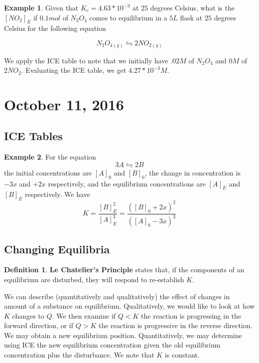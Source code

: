 \documentclass[11pt]{article}
\theoremstyle{plain} %
\theoremstyle{definition}
\newtheorem*{definition}{Definition} %
\theoremstyle{example}
\newtheorem*{example}{Example}
\theoremstyle{remark}
\begin{document}
\begin{example}
Given that $K_c = 4.63*10^{-3}$ at $25$ degrees Celsius, what is the $[NO_2]_E$ if $0.1 mol$ of $N_2O_4$ comes to equilibrium in a $5L$ flask at $25$ degrees Celsius for the following equation

$$N_2O_{4(g)} \leftrightharpoons 2NO_{2(g)}$$
\end{example}

We apply the ICE table to note that we initially have $.02 M$ of $N_2O_4$ and $0M$ of $2NO_2$. Evaluating the ICE table, we get $4.27*10^{-3} M$.

\section{October 11, 2016}
\subsection{ICE Tables}

\begin{example}
	For the equation $$3A \leftrightharpoons 2B$$ the initial concentrations are $[A]_0$ and $[B]_0$, the change in concentration is $-3x$ and $+2x$ respectively, and the equilibrium concentrations are $[A]_E$ and $[B]_E$ respectively. We have $$K = \frac{[B]_E^2}{[A]_E^3} = \frac{([B]_0 + 2x)^2}{([A]_0-3x)^3}$$
\end{example}

\subsection{Changing Equilibria}



\begin{definition}
\textbf{Le Chatelier's Principle} states that, if the components of an equilibrium are disturbed, they will respond to re-establish $K$. 
\end{definition}

We can describe (quantitatively and qualitatively) the effect of changes in amount of a substance on equilibrium. Qualitatively, we would like to look at how $K$ changes to $Q$. We then examine if $Q<K$ the reaction is progressing in the forward direction, or if $Q > K$ the reaction is progressive in the reverse direction. We may obtain a new equilibrium position. Quantitatively, we may determine using ICE the new equilibrium concentration given the old equilibrium concentration plus the disturbance. We note that $K$ is constant.
\end{document}
